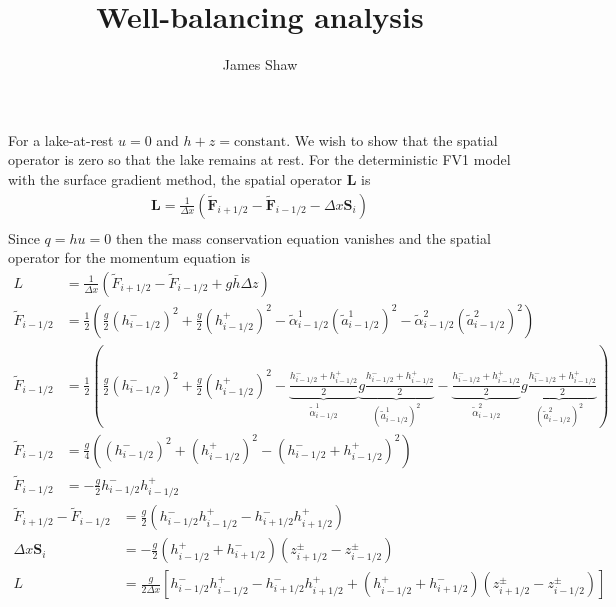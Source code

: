 \documentclass{article}
\title{Well-balancing analysis}
\author{James Shaw}
\newcommand{\riemannflux}{\widetilde{\vect{F}}}
\newcommand{\source}{\vect{S}}
\newcommand{\vect}{\mathbf}
\begin{document}
For a lake-at-rest $u=0$ and $h + z = \text{constant}$.  We wish to show that the spatial operator is zero so that the lake remains at rest.
For the deterministic FV1 model with the surface gradient method, the spatial operator $\vect{L}$ is
\begin{align}
\vect{L} = \frac{1}{\Delta x} \left( \riemannflux_{i+1/2} - \riemannflux_{i-1/2} - \Delta x \source_i \right) \\
\end{align}
Since $q = hu = 0 $ then the mass conservation equation vanishes and the spatial operator for the momentum equation is
\begin{align}
	L &= \frac{1}{\Delta x} \left( \widetilde{F}_{i+1/2} - \widetilde{F}_{i-1/2} + g \bar{h} \Delta z \right) \\
	\widetilde{F}_{i-1/2} &= \frac{1}{2} \left( \frac{g}{2} \left(h_{i-1/2}^-\right)^2
	+ \frac{g}{2} \left(h_{i-1/2}^+ \right)^2
	- \tilde{\alpha}^1_{i-1/2} \left( \tilde{a}^1_{i-1/2} \right)^2
	- \tilde{\alpha}^2_{i-1/2} \left( \tilde{a}^2_{i-1/2} \right)^2
	\right) \\
	\widetilde{F}_{i-1/2} &= \frac{1}{2} \left( \frac{g}{2} \left(h_{i-1/2}^-\right)^2
	+ \frac{g}{2} \left(h_{i-1/2}^+ \right)^2
	- \underbrace{\frac{h_{i-1/2}^- + h_{i-1/2}^+}{2}}_{\tilde{\alpha}_{i-1/2}^1} 
	\underbrace{g \frac{h_{i-1/2}^- + h_{i-1/2}^+}{2}}_{\left( \tilde{a}_{i-1/2}^1 \right)^2}
	- \underbrace{\frac{h_{i-1/2}^- + h_{i-1/2}^+}{2}}_{\tilde{\alpha}_{i-1/2}^2} 
	\underbrace{g \frac{h_{i-1/2}^- + h_{i-1/2}^+}{2}}_{\left( \tilde{a}_{i-1/2}^2 \right)^2}
	\right) \\
	\widetilde{F}_{i-1/2} &= \frac{g}{4} \left( \left(h_{i-1/2}^-\right)^2
	+ \left(h_{i-1/2}^+ \right)^2
	- \left(h_{i-1/2}^- + h_{i-1/2}^+\right)^2
	\right) \\
	\widetilde{F}_{i-1/2} &= -\frac{g}{2} h_{i-1/2}^- h_{i-1/2}^+
\end{align}
\begin{align}
	\widetilde{F}_{i+1/2} - \widetilde{F}_{i-1/2} &= \frac{g}{2}
	\left(
	h_{i-1/2}^- h_{i-1/2}^+ - h_{i+1/2}^- h_{i+1/2}^+
	\right) \\
	\Delta x \source_i &= -\frac{g}{2} \left(h_{i-1/2}^+ + h_{i+1/2}^-\right)
	\left( z_{i+1/2}^\pm - z_{i-1/2}^\pm \right) \\
	L &= \frac{g}{2 \Delta x} \left[ 
	h_{i-1/2}^- h_{i-1/2}^+ - h_{i+1/2}^- h_{i+1/2}^+
	+
	\left(h_{i-1/2}^+ + h_{i+1/2}^-\right)
	\left( z_{i+1/2}^\pm - z_{i-1/2}^\pm \right) 
	\right]
\end{align}
\end{document}
